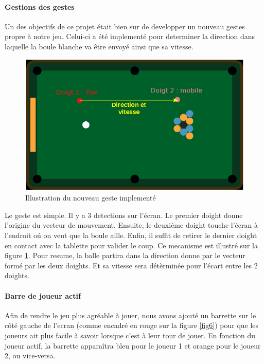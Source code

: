 \paragraph{Gestions des gestes}

Un des objectifs de ce projet était bien sur de developper un nouveau gestes propre à notre jeu. Celui-ci a été implementé pour determiner la direction dans laquelle la boule blanche va être envoyé ainsi que sa vitesse. 

\begin{figure}[!ht]
\centering
\includegraphics[scale=0.6]{gesture.png}
\caption{Illustration du nouveau geste implementé}
\label{fig5}
\end{figure}

Le geste est simple. Il y a 3 detections sur l'écran. Le premier doight donne l'origine du vecteur de mouvement. Ensuite, le deuxième doight touche l'écran à l'endroit oú on veut que la boule  aille. Enfin, il suffit de retirer le dernier doight en contact avec la tablette pour valider le coup. Ce mecanisme est illustré sur la figure \ref{fig5}. Pour resume, la balle partira dans la direction donne par le vecteur formé par les deux doights. Et sa vitesse sera détèrminée pour l'écart entre les 2 doights.


\paragraph{Barre de joueur actif}

Afin de rendre le jeu plus agréable à jouer, nous avons ajouté un barrette sur le côté gauche de l'ecran (comme encadré en rouge sur la figure \ref{fig6}) pour que les joueurs ait plus facile à savoir lorsque c'est à leur tour de jouer. En fonction du joueur actif, la barrette apparaîtra bleu pour le joueur 1 et orange pour le joueur 2, ou vice-versa.


